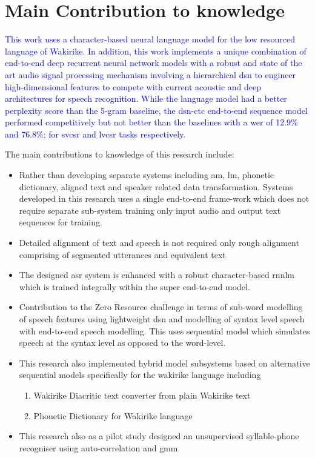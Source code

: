 \section{Main Contribution to knowledge}
\textcolor{blue}{This work uses a character-based neural language model for the low resourced language of Wakirike.  In addition, this work implements a unique combination of end-to-end deep recurrent neural network models with a robust and state of the art audio signal processing mechanism involving a hierarchical \acrfull{dsn} to engineer high-dimensional features to compete with current acoustic and deep architectures for speech recognition. While the language model had a better perplexity score than the 5-gram baseline, the \acrshort{dsn}-\acrshort{ctc} end-to-end sequence model performed competitively but not better than the baselines with a \acrlong{wer} of 12.9\% and 76.8\%; for \acrshort{svcsr} and \acrshort{lvcsr} tasks respectively.}

\startblue
The main contributions to knowledge of this research include:
\begin{itemize}
    \item Rather than developing separate systems including \acrlong{am}, \acrlong{lm}, phonetic dictionary, aligned text and speaker related data transformation.  Systems developed in this research uses a single end-to-end frame-work which does not require separate sub-system training only input audio and output text sequences for training.
    \item Detailed alignment of text and speech is not required only rough alignment comprising of segmented utterances and equivalent text
    \item The designed \acrshort{asr} system is enhanced with a robust character-based \acrlong{rnnlm} which is trained integrally within the super end-to-end model.
    \item Contribution to the Zero Resource challenge \citep{versteegh2015zero} in terms of sub-word modelling of speech features using lightweight \acrfull{dsn} and modelling of syntax level speech with end-to-end speech modelling.  This uses sequential model which simulates speech at the syntax level as opposed to the word-level.
    \item This research also implemented hybrid model subsystems based on alternative sequential models specifically for the wakirike language including
\begin{enumerate}
    \item Wakirike Diacritic text converter from plain Wakirike text 
    \item Phonetic Dictionary for Wakirike language
\end{enumerate}
    \item This research also as a pilot study designed an unsupervised syllable-phone recogniser using auto-correlation and \acrfull{gmm}
\end{itemize}


